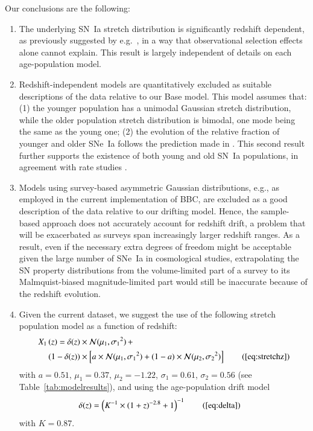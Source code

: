 \documentclass[]{aa}
\begin{document}
Our conclusions are the following:
\begin{enumerate}

    \item The underlying SN~Ia stretch distribution is significantly redshift
        dependent, as previously suggested by e.g.~\cite{howell2007}, in
        a way that observational selection effects alone cannot explain. This
        result is largely independent of details on each age-population model.
    
    \item Redshift-independent models are quantitatively excluded as
        suitable descriptions of the data relative to our Base model. This model
        assumes that: (1) the younger population has a unimodal Gaussian stretch
        distribution, while the older population stretch distribution is
        bimodal, one mode being the same as the young one; (2) the evolution of
        the relative fraction of younger and older SNe~Ia follows the prediction
        made in \cite{rigault2020}. This second result further supports
        the existence of both young and old SN~Ia populations, in agreement with
        rate studies \citep{mannucci2005, scannapieco2005, sullivan2006,
        aubourg2008}. 
        
    \item Models using survey-based asymmetric Gaussian distributions,
        e.g., as employed in the current implementation of BBC, are
        excluded as a good description of the data relative to our
        drifting model. Hence, the sample-based approach does not accurately
        account for redshift drift, a problem that will be exacerbated
        as surveys span increasingly larger redshift ranges. As a
    result, even if the necessary extra degrees of freedom might be acceptable
    given the large number of SNe~Ia in cosmological studies, extrapolating the
    SN property distributions from the volume-limited part of a survey to its
    Malmquist-biased magnitude-limited part would still be inaccurate
    because of the redshift evolution.

    \item Given the current dataset, we suggest the use of the following stretch
        population model as a function of redshift:
        \begin{align*}
        \label{eqconclusion:stretchz}
            X_1\left(z \right) =
            \delta(z)&\times\mathcal{N}(\mu_1,\sigma_1{}^2)\,+\nonumber\\
            (1-\delta(z))&\times \left[a\times\mathcal{N}(\mu_1,\sigma_1{}^2) +
            (1-a)\times\mathcal{N}(\mu_2,\sigma_2{}^2)\right]
            \tag{\ref{eq:stretchz}}
        \end{align*}
        with $a=0.51$, $\mu_1=0.37$, $\mu_2=-1.22$, $\sigma_1=0.61$,
        $\sigma_2=0.56$ (see Table~\ref{tab:modelresults}), and using the
        age-population drift model \begin{align*}
            \delta(z) & = \left( K^{-1} \times (1+z)^{-2.8} +1 \right)^{-1}
            \tag{\ref{eq:delta}}
        \end{align*}
        with $K=0.87$.
\end{enumerate}
\end{document}
